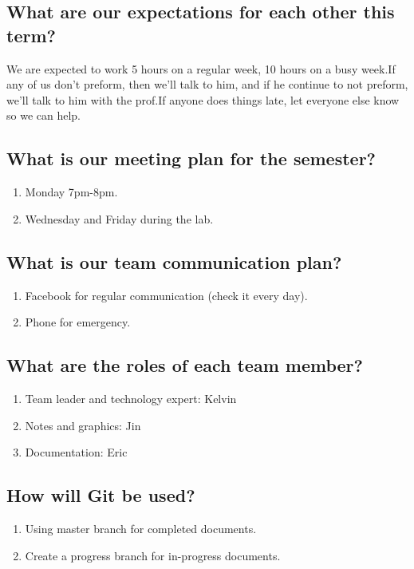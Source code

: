 \documentclass[11pt]{meetingmins}
\begin{document}
	\subsection{What are our expectations for each other this term?}
		We are expected to work 5 hours on a regular week, 10 hours on a busy week.If any of us don't preform, then we'll talk to him, and if he continue to not preform, we'll talk to him with the prof.If anyone does things late, let everyone else know so we can help.
		

	\subsection{What is our meeting plan for the semester?}
		\begin{enumerate}
			\item{Monday 7pm-8pm. }
			\item{Wednesday and Friday during the lab.}
		\end{enumerate}
		
	\subsection{What is our team communication plan?}
		\begin{enumerate}
			\item{Facebook for regular communication (check it every day).}
			\item{Phone for emergency.}
		\end{enumerate}
		
	\subsection{What are the roles of each team member?}
		\begin{enumerate}
			\item{Team leader and technology expert: Kelvin}
			\item{Notes and graphics: Jin}
			\item{Documentation: Eric}
		\end{enumerate}

	\subsection{How will Git be used?}
		\begin{enumerate}
			\item{Using master branch for completed documents.}
			\item{Create a progress branch for in-progress documents.}
		\end{enumerate}
		
\end{document}
